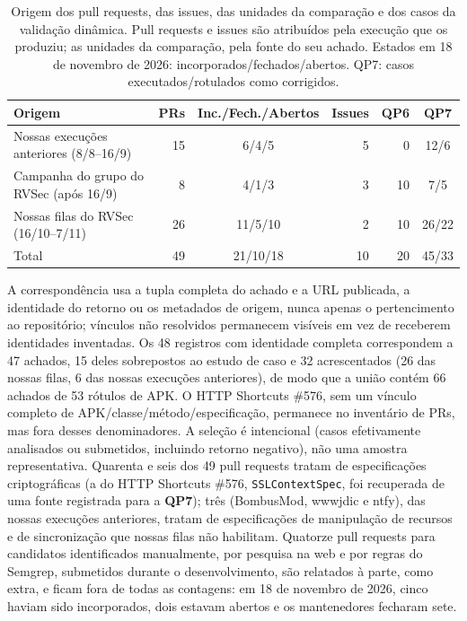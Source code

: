 \documentclass[conference]{IEEEtran}
\newcommand{\researchq}[1]{\textbf{QP#1}}
\begin{document}
\begin{table}[H]
\centering
\caption{Origem dos pull requests, das issues, das unidades da comparação e
dos casos da validação dinâmica. Pull requests e issues são atribuídos pela
execução que os produziu; as unidades da comparação, pela fonte do seu achado.
Estados em 18 de novembro de 2026: incorporados/fechados/abertos. QP7: casos
executados/rotulados como corrigidos.}
\label{tab:origin}
\footnotesize
\setlength{\tabcolsep}{3pt}
\begin{tabular}{p{3.0cm}rcrrc}
\toprule
Origem & PRs & Inc./Fech./Abertos & Issues & QP6 & QP7 \\
\midrule
Nossas execuções anteriores (8/8--16/9) & 15 & 6/4/5 & 5 & 0 & 12/6 \\
Campanha do grupo do RVSec (após 16/9) & 8 & 4/1/3 & 3 & 10 & 7/5 \\
Nossas filas do RVSec (16/10--7/11) & 26 & 11/5/10 & 2 & 10 & 26/22 \\
\midrule
Total & 49 & 21/10/18 & 10 & 20 & 45/33 \\
\bottomrule
\end{tabular}
\end{table}


A correspondência usa a tupla completa do achado e a URL publicada, a identidade do retorno
ou os metadados de origem, nunca apenas o pertencimento ao repositório; vínculos não resolvidos permanecem
visíveis em vez de receberem identidades inventadas. Os 48 registros com
identidade completa correspondem a 47 achados, 15 deles sobrepostos ao estudo de caso
e 32 acrescentados (26 das nossas filas, 6 das nossas execuções anteriores), de modo
que a união contém 66 achados de 53 rótulos de APK. O HTTP Shortcuts \#576,
sem um vínculo completo de APK/classe/método/especificação, permanece no inventário
de PRs, mas fora desses denominadores. A seleção é intencional (casos
efetivamente analisados ou submetidos, incluindo retorno negativo), não uma
amostra representativa. Quarenta e seis dos 49 pull requests tratam de
especificações criptográficas (a do HTTP Shortcuts \#576, \texttt{SSLContextSpec},
foi recuperada de uma fonte registrada para a \researchq{7}); três (BombusMod,
wwwjdic e ntfy), das nossas execuções anteriores, tratam de especificações de
manipulação de recursos e de sincronização que nossas filas não habilitam. Quatorze pull requests para candidatos identificados
manualmente, por pesquisa na web e por regras do Semgrep, submetidos durante o
desenvolvimento, são relatados à parte, como extra, e ficam fora de todas as contagens: em
18 de novembro de 2026, cinco haviam sido incorporados, dois estavam abertos e
os mantenedores fecharam sete.
\end{document}
